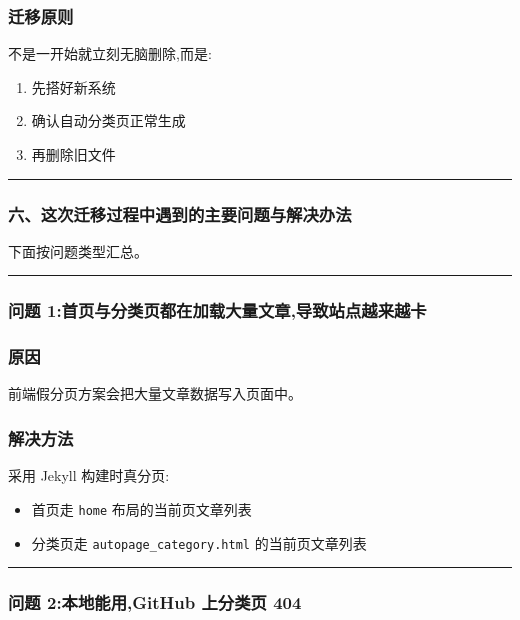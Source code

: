 \documentclass[lang=cn,scheme=chinese,color=blue,device=normal,toc=onecol,math=cm]{elegantbook}
\begin{document}
\subsubsection{迁移原则}


不是一开始就立刻无脑删除,而是:\par


\begin{enumerate}
\item 先搭好新系统
\item 确认自动分类页正常生成
\item 再删除旧文件
\end{enumerate}


\medskip\hrule\medskip


\subsubsection{六、这次迁移过程中遇到的主要问题与解决办法}


下面按问题类型汇总。\par


\medskip\hrule\medskip


\subsubsection{问题 1:首页与分类页都在加载大量文章,导致站点越来越卡}


\subsubsection{原因}


前端假分页方案会把大量文章数据写入页面中。\par


\subsubsection{解决方法}


采用 Jekyll 构建时真分页:\par


\begin{itemize}
\item 首页走 \texttt{home} 布局的当前页文章列表
\item 分类页走 \texttt{autopage\_\allowbreak{}category.html} 的当前页文章列表
\end{itemize}


\medskip\hrule\medskip


\subsubsection{问题 2:本地能用,GitHub 上分类页 404}
\end{document}
